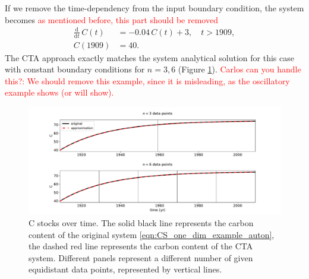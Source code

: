\documentclass[11pt,a4paper]{article}
\newcommand{\red}[1]{\textcolor{red}{#1}}
\newcommand{\deriv}[1]{\frac{\mathrm{d}}{\mathrm{d}#1}}
\begin{document}
If we remove the time-dependency from the input boundary condition, the system becomes
\red{as mentioned before, this part should be removed}
\begin{equation}\label{eqn:CS_one_dim_example_auton}
    \begin{aligned}
        \deriv{t}\,C(t) &= -0.04\,C(t) + 3,\quad t>1909,\\
        C(1909) &= 40.
    \end{aligned}
\end{equation}
The CTA approach exactly matches the system analytical solution for this case with constant boundary conditions for $n=3,6$ (Figure \ref{fig:CS_one_dim_example_auton}).
\red{Carlos can you handle this?: We should remove this example, since it is misleading, as the oscillatory example shows (or will show).}

\begin{figure}[htbp]
    \centering 
    \includegraphics[width=1.0\linewidth]{figs/interpol_pwc_1_auton.pdf}
    \caption{C stocks over time.
        The solid black line represents the carbon content of the original system \eqref{eqn:CS_one_dim_example_auton}, the dashed red line represents the carbon content of the CTA system.
        Different panels represent a different number of given equidistant data points, represented by vertical lines.
        }
    \label{fig:CS_one_dim_example_auton}
\end{figure}        
\end{document}
